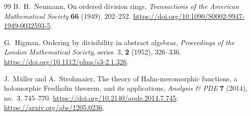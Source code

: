\documentclass[11pt,letterpaper]{article}
\theoremstyle{definition}
\theoremstyle{remark}
\numberwithin{equation}{section}
\begin{document}
\begin{thebibliography}{99}
B.~H.~Neumann,
On ordered division rings,
\emph{Transactions of the American Mathematical Society} \textbf{66} (1949),
202--252.
\url{https://doi.org/10.1090/S0002-9947-1949-0032593-5}.

G.~Higman,
Ordering by divisibility in abstract algebras,
\emph{Proceedings of the London Mathematical Society}, series~3,
\textbf{2} (1952), 326--336.
\url{https://doi.org/10.1112/plms/s3-2.1.326}.

J.~M\"uller and A.~Strohmaier,
The theory of Hahn-meromorphic functions, a holomorphic Fredholm theorem,
and its applications,
\emph{Analysis \& PDE} \textbf{7} (2014), no.~3, 745--770.
\url{https://doi.org/10.2140/apde.2014.7.745};
\url{https://arxiv.org/abs/1205.0236}.
\end{thebibliography}
\end{document}

